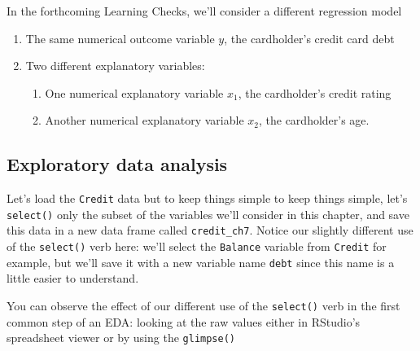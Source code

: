\documentclass[12pt, krantz2,]{krantz}
\makeatletter
\newenvironment{Shaded}{\begin{snugshade}}{\end{snugshade}}
\newcommand{\DataTypeTok}[1]{\textcolor[rgb]{0.27,0.27,0.27}{#1}}
\newcommand{\KeywordTok}[1]{\textcolor[rgb]{0.27,0.27,0.27}{\textbf{#1}}}
\newcommand{\NormalTok}[1]{#1}
\newcommand{\OperatorTok}[1]{\textcolor[rgb]{0.43,0.43,0.43}{\textbf{#1}}}
\newcommand{\StringTok}[1]{\textcolor[rgb]{0.5,0.5,0.5}{#1}}
\providecommand{\tightlist}{%
  \setlength{\itemsep}{0pt}\setlength{\parskip}{0pt}}
\newenvironment{kframe}{%
\medskip{}
\setlength{\fboxsep}{.8em}
 \def\at@end@of@kframe{}%
 \ifinner\ifhmode%
  \def\at@end@of@kframe{\end{minipage}}%
  \begin{minipage}{\columnwidth}%
 \fi\fi%
 \def\FrameCommand##1{\hskip\@totalleftmargin \hskip-\fboxsep
 \colorbox{shadecolor}{##1}\hskip-\fboxsep
     \hskip-\linewidth \hskip-\@totalleftmargin \hskip\columnwidth}%
 \MakeFramed {\advance\hsize-\width
   \@totalleftmargin\z@ \linewidth\hsize
   \@setminipage}}%
 {\par\unskip\endMakeFramed%
 \at@end@of@kframe}
\renewenvironment{Shaded}{\begin{kframe}}{\end{kframe}}
\makeatother
\begin{document}
In the forthcoming Learning Checks, we'll consider a different regression model

\begin{enumerate}
\def\labelenumi{\arabic{enumi}.}
\tightlist
\item
  The same numerical outcome variable \(y\), the cardholder's credit card debt
\item
  Two different explanatory variables:

  \begin{enumerate}
  \def\labelenumii{\arabic{enumii}.}
  \tightlist
  \item
    One numerical explanatory variable \(x_1\), the cardholder's credit rating
  \item
    Another numerical explanatory variable \(x_2\), the cardholder's age.
  \end{enumerate}
\end{enumerate}

\hypertarget{model3EDA}{%
\subsection{Exploratory data analysis}\label{model3EDA}}

Let's load the \texttt{Credit} data but to keep things simple to keep things simple, let's \texttt{select()} only the subset of the variables we'll consider in this chapter, and save this data in a new data frame called \texttt{credit\_ch7}. Notice our slightly different use of the \texttt{select()} verb here: we'll select the \texttt{Balance} variable from \texttt{Credit} for example, but we'll save it with a new variable name \texttt{debt} since this name is a little easier to understand.

\begin{Shaded}
\end{Shaded}

You can observe the effect of our different use of the \texttt{select()} verb in the first common step of an EDA: looking at the raw values either in RStudio's spreadsheet viewer or by using the \texttt{glimpse()}
\end{document}
